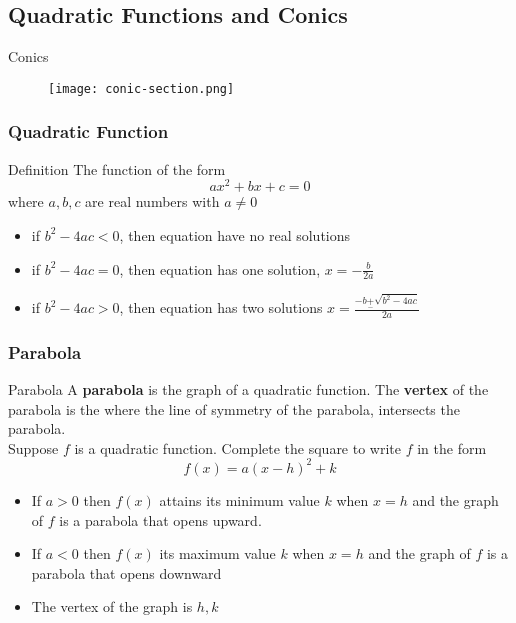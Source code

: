   \subsection{Quadratic Functions and Conics}
  \begin{frame}{Conics}
    \begin{figure}
      \begin{center}
        \texttt{[image: conic-section.png]}
      \end{center}
    \end{figure}
  \end{frame}
  \begin{frame}
    \frametitle{Quadratic Function}
    \begin{block}{Definition}
      The function of the form 
      \[ax^{2} + bx + c = 0\]
      where \(a,b,c\) are real numbers with \(a \neq 0\)
      \begin{itemize}
        \item if \(b^{2} - 4ac < 0\), then equation have no real solutions
        \item if \(b^{2} - 4ac = 0\), then equation has one solution, \(x = -\frac{b}{2a}\)
        \item if \(b^{2} - 4ac  > 0\), then equation has two solutions \(x = \frac{-b \underset{-}{+}\sqrt{b^{2} - 4ac}}{2a}\)
      \end{itemize}
    \end{block}
  \end{frame}

  \begin{frame}
    \frametitle{Parabola}
    \begin{block}{Parabola}
      A \textbf{parabola} is the graph of a quadratic function. The \textbf{vertex} of the parabola is the where the line of symmetry of the parabola, intersects the parabola. \\ 

      \bigskip 
      Suppose \(f\) is a quadratic function. Complete the square to write \(f\) in the form 
      \[ f(x) = a(x-h)^{2} + k \] 
      \begin{itemize}
        \item If \(a > 0\) then \(f(x)\) attains its minimum value \(k\) when \(x=h\) and the graph of \(f\) is a parabola that opens upward.
        \item If \(a < 0 \) then \(f(x) \) its maximum value \(k\) when \(x=h\) and the graph of \(f\) is a parabola that opens downward 
        \item The vertex of the graph is \(h,k\)
      \end{itemize}

    \end{block}
  \end{frame}

